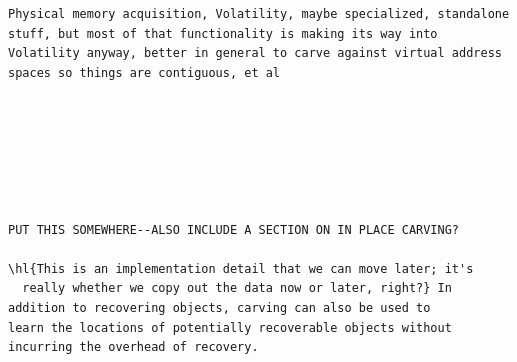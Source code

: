 \begin{Verbatim}
Physical memory acquisition, Volatility, maybe specialized, standalone
stuff, but most of that functionality is making its way into
Volatility anyway, better in general to carve against virtual address
spaces so things are contiguous, et al







PUT THIS SOMEWHERE--ALSO INCLUDE A SECTION ON IN PLACE CARVING? 

\hl{This is an implementation detail that we can move later; it's
  really whether we copy out the data now or later, right?} In addition to recovering objects, carving can also be used to 
learn the locations of potentially recoverable objects without
incurring the overhead of recovery. 





\end{Verbatim}
